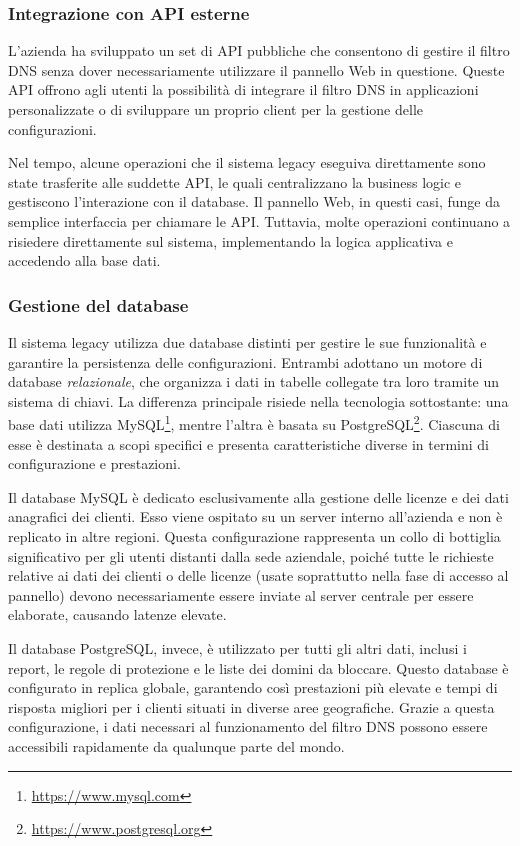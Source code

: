 \subsubsection{Integrazione con API esterne}
L'azienda ha sviluppato un set di API pubbliche che consentono di gestire il filtro DNS senza dover necessariamente utilizzare il pannello Web in questione. Queste API offrono agli utenti la possibilità di integrare il filtro DNS in applicazioni personalizzate o di sviluppare un proprio client per la gestione delle configurazioni.

Nel tempo, alcune operazioni che il sistema legacy eseguiva direttamente sono state trasferite alle suddette API, le quali centralizzano la business logic e gestiscono l'interazione con il database. Il pannello Web, in questi casi, funge da semplice interfaccia per chiamare le API. Tuttavia, molte operazioni continuano a risiedere direttamente sul sistema, implementando la logica applicativa e accedendo alla base dati.

\subsubsection{Gestione del database}
Il sistema legacy utilizza due database distinti per gestire le sue funzionalità e garantire la persistenza delle configurazioni. Entrambi adottano un motore di database \emph{relazionale}, che organizza i dati in tabelle collegate tra loro tramite un sistema di chiavi. La differenza principale risiede nella tecnologia sottostante: una base dati utilizza MySQL\footnote{\url{https://www.mysql.com}}, mentre l’altra è basata su PostgreSQL\footnote{\url{https://www.postgresql.org}}. Ciascuna di esse è destinata a scopi specifici e presenta caratteristiche diverse in termini di configurazione e prestazioni.

Il database MySQL è dedicato esclusivamente alla gestione delle licenze e dei dati anagrafici dei clienti. Esso viene ospitato su un server interno all’azienda e non è replicato in altre regioni. Questa configurazione rappresenta un collo di bottiglia significativo per gli utenti distanti dalla sede aziendale, poiché tutte le richieste relative ai dati dei clienti o delle licenze (usate soprattutto nella fase di accesso al pannello) devono necessariamente essere inviate al server centrale per essere elaborate, causando latenze elevate.

Il database PostgreSQL, invece, è utilizzato per tutti gli altri dati, inclusi i report, le regole di protezione e le liste dei domini da bloccare. Questo database è configurato in replica globale, garantendo così prestazioni più elevate e tempi di risposta migliori per i clienti situati in diverse aree geografiche. Grazie a questa configurazione, i dati necessari al funzionamento del filtro DNS possono essere accessibili rapidamente da qualunque parte del mondo.

